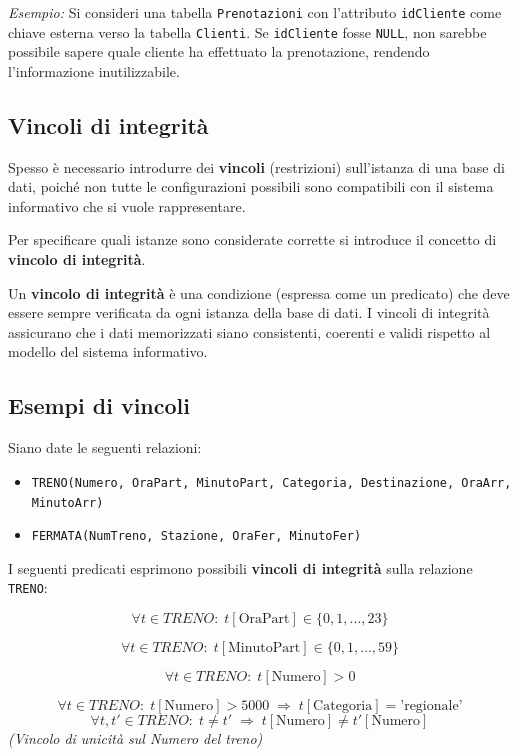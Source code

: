 \textit{Esempio:}  
Si consideri una tabella \texttt{Prenotazioni} con l'attributo \texttt{idCliente} come chiave esterna verso la tabella \texttt{Clienti}.  
Se \texttt{idCliente} fosse \texttt{NULL}, non sarebbe possibile sapere quale cliente ha effettuato la prenotazione, rendendo l'informazione inutilizzabile.
\subsection{Vincoli di integrità}
Spesso è necessario introdurre dei \textbf{vincoli} (restrizioni) sull'istanza
di una base di dati, poiché non tutte le configurazioni possibili sono
compatibili con il sistema informativo che si vuole rappresentare.

Per specificare quali istanze sono considerate corrette si introduce il
concetto di \textbf{vincolo di integrità}.

\begin{tcolorbox}[
colback=yellow!20,
colframe=yellow!50!black,
title=\textbf{Vincolo di Integrità}
]
Un \textbf{vincolo di integrità} è una condizione (espressa come un predicato)
che deve essere sempre verificata da ogni istanza della base di dati.  
I vincoli di integrità assicurano che i dati memorizzati siano consistenti,
coerenti e validi rispetto al modello del sistema informativo.
\end{tcolorbox}
\subsection{Esempi di vincoli}

Siano date le seguenti relazioni:

\begin{itemize}
    \item \texttt{TRENO(Numero, OraPart, MinutoPart, Categoria, Destinazione, OraArr, MinutoArr)}
    \item \texttt{FERMATA(NumTreno, Stazione, OraFer, MinutoFer)}
\end{itemize}

I seguenti predicati esprimono possibili \textbf{vincoli di integrità} sulla relazione \texttt{TRENO}:

\[
\forall t \in TRENO :\; t[\text{OraPart}] \in \{0,1,\ldots,23\}
\]

\[
\forall t \in TRENO :\; t[\text{MinutoPart}] \in \{0,1,\ldots,59\}
\]

\[
\forall t \in TRENO :\; t[\text{Numero}] > 0
\]

\[
\forall t \in TRENO :\; t[\text{Numero}] > 5000 \;\Rightarrow\; t[\text{Categoria}] = \text{'regionale'}
\]
\[
\forall t, t' \in TRENO :\; t \neq t' \;\Rightarrow\; t[\text{Numero}] \neq t'[\text{Numero}]
\]
\textit{(Vincolo di unicità sul Numero del treno)}

